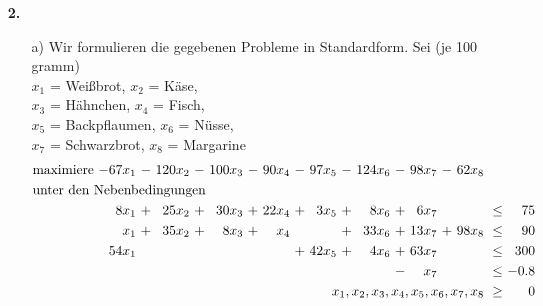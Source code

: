 \documentclass [a4paper,11pt]{article}
\begin{document}
\begin{enumerate}
\begin{enumerate}

            \end{enumerate}
        \item[\textbf{2.}]
        \begin{enumerate}
                \item[a)]
                    Wir formulieren die gegebenen Probleme in Standardform. Sei (je 100 gramm)\\
                    $x_1$ = Weißbrot, $x_2$ = Käse,\\
                    $x_3$ = Hähnchen, $x_4$ = Fisch,\\
                    $x_5$ = Backpflaumen, $x_6$ = Nüsse,\\
                    $x_7$ = Schwarzbrot, $x_8$ = Margarine\\

                \begin{align*}
                \begin{alignedat}{10}
                & \text{maximiere } & -67x_1 &\ - &\ 120x_2 &\ - &\ 100x_3 &\ - &\ 90x_4 &\ - &\ 97x_5 &\ - &\ 124x_6 &\ - &\ 98x_7 &\ - &\ 62x_8 & & \\
                & \rlap{unter den Nebenbedingungen} & & & & & & & & & & & & & & & & & \\
                &&  8x_1 &\ + &\ 25x_2 &\ + &\ 30x_3 &\ + &\ 22x_4 &\ + &\  3x_5 &\ + &\  8x_6 &\ + &\  6x_7 &     &        &\ \leq &\  75 \\
                &&   x_1 &\ + &\ 35x_2 &\ + &\  8x_3 &\ + &\   x_4 &    &        &\ + &\ 33x_6 &\ + &\ 13x_7 &\ +  &\ 98x_8 &\ \leq &\  90 \\
                && 54x_1 &    &        &    &        &    &        &\ + &\ 42x_5 &\ + &\  4x_6 &\ + &\ 63x_7 &     &        &\ \leq &\ 300 \\
                &&       &    &        &    &        &    &        &    &        &    &        &\ - &\   x_7 &     &        &\ \leq &\ -0.8 \\
                && & & & & & & & & & & & & & & \llap{$x_1, x_2, x_3, x_4, x_5, x_6, x_7, x_8$} &\ \geq &\ 0
                \end{alignedat}
                \end{align*}


\end{enumerate}
\end{enumerate}
\end{document}
